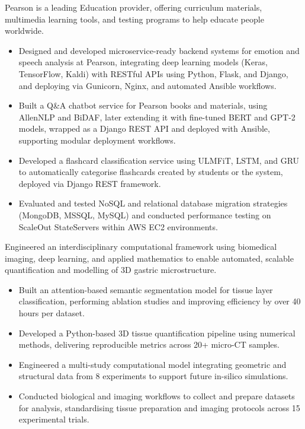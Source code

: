 \documentclass[12pt,a4paper,withhyper]{altacv}
\begin{document}
\divider{}

Pearson is a leading Education provider, offering curriculum materials, multimedia learning tools, and testing programs to help educate people worldwide.
\medskip
\begin{itemize}
    \item Designed and developed microservice-ready backend systems for emotion and speech analysis at Pearson, integrating deep learning models (Keras, TensorFlow, Kaldi) with RESTful APIs using Python, Flask, and Django, and deploying via Gunicorn, Nginx, and automated Ansible workflows.

    \item Built a Q\&A chatbot service for Pearson books and materials, using AllenNLP and BiDAF, later extending it with fine-tuned BERT and GPT-2 models, wrapped as a Django REST API and deployed with Ansible, supporting modular deployment workflows.

    \item Developed a flashcard classification service using ULMFiT, LSTM, and GRU to automatically categorise flashcards created by students or the system, deployed via Django REST framework.

    \item Evaluated and tested NoSQL and relational database migration strategies (MongoDB, MSSQL, MySQL) and conducted performance testing on ScaleOut StateServers within AWS EC2 environments.

\end{itemize}

\medskip



Engineered an interdisciplinary computational framework using biomedical imaging, deep learning, and applied mathematics to enable automated, scalable quantification and modelling of 3D gastric microstructure.

\begin{itemize}
    \item Built an attention-based semantic segmentation model for tissue layer classification, performing ablation studies and improving efficiency by over 40 hours per dataset.
    \item Developed a Python-based 3D tissue quantification pipeline using numerical methods, delivering reproducible metrics across 20+ micro-CT samples.
    \item Engineered a multi-study computational model integrating geometric and structural data from 8 experiments to support future in-silico simulations.
    \item Conducted biological and imaging workflows to collect and prepare datasets for analysis, standardising tissue preparation and imaging protocols across 15 experimental trials.
\end{itemize}
\end{document}
